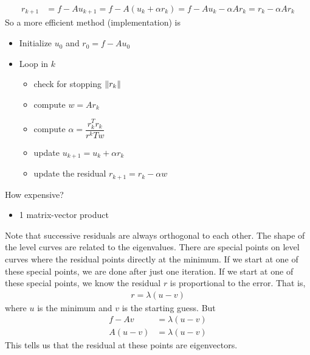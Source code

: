 \documentclass{article}
\begin{document}
    \begin{align}
        r_{k+1} &= f - Au_{k+1} = f - A(u_k + \alpha r_k) = f - Au_k - \alpha Ar_k = r_k - \alpha Ar_k
    \end{align}
    So a more efficient method (implementation) is
    \begin{itemize}
        \item Initialize $u_0$ and $r_0 = f - Au_0$
        \item Loop in $k$
        \begin{itemize}
            \item check for stopping $\norm{r_k}$
            \item compute $w = Ar_k$
            \item compute $\alpha = \dfrac{r_k^Tr_k}{r^kTw}$
            \item update $u_{k+1} = u_k + \alpha r_k$
            \item update the residual $r_{k+1} = r_k - \alpha w$
        \end{itemize}
    \end{itemize}
    How expensive?
    \begin{itemize}
        \item 1 matrix-vector product
    \end{itemize}

    Note that successive residuals are always orthogonal to each other.  The shape of the level curves are related to the eigenvalues.  There are special points on level curves where the residual points directly at the minimum.  If we start at one of these special points, we are done after just one iteration.  If we start at one of these special points, we know the residual $r$ is proportional to the error.  That is,
    \begin{align}
        r = \lambda(u - v)
    \end{align}
    where $u$ is the minimum and $v$ is the starting guess.  But
    \begin{align}
        f - Av &= \lambda(u - v) \\
        A(u - v) &= \lambda(u - v)
    \end{align}
    This tells us that the residual at these points are eigenvectors. \\
\end{document}
